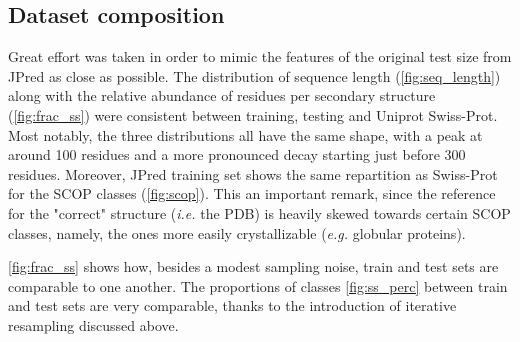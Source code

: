 \documentclass[nocrop]{bioinfo}
\begin{document}
\subsection*{Dataset composition}
Great effort was taken in order to mimic the features of the original test size from JPred as close as possible.
The distribution of sequence length (\autoref{fig:seq_length}) along with the relative abundance of residues per secondary structure (\autoref{fig:frac_ss}) were consistent between training, testing and Uniprot Swiss-Prot.
Most notably, the three distributions all have the same shape, with a peak at around 100 residues and a more pronounced decay starting just before 300 residues.
Moreover, JPred training set shows the same repartition as Swiss-Prot for the SCOP classes (\autoref{fig:scop}). 
This an important remark, since the reference for the "correct" structure (\textit{i.e.} the PDB) is heavily skewed towards certain SCOP classes, namely, the ones more easily crystallizable (\textit{e.g.} globular proteins).

\autoref{fig:frac_ss} shows how, besides a modest sampling noise, train and test sets are comparable to one another.
The proportions of classes \autoref{fig:ss_perc} between train and test sets are very comparable, thanks to the introduction of iterative resampling discussed above.
\end{document}
